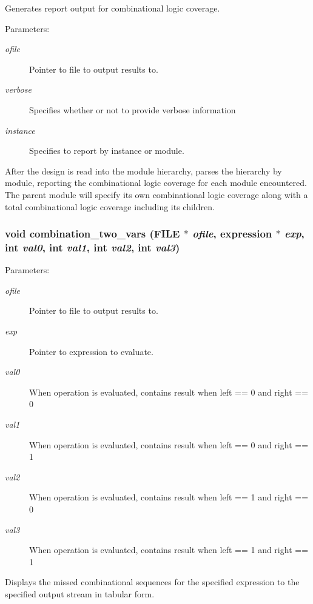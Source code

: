 Generates report output for combinational logic coverage.

\begin{Desc}
\item[Parameters: ]\par
\begin{description}
\item[{\em 
ofile}]Pointer to file to output results to. \item[{\em 
verbose}]Specifies whether or not to provide verbose information \item[{\em 
instance}]Specifies to report by instance or module.\end{description}
\end{Desc}
After the design is read into the module hierarchy, parses the hierarchy by module, reporting the combinational logic coverage for each module encountered. The parent  module will specify its own combinational logic coverage along with a total combinational logic coverage including its children. 
\subsubsection{\setlength{\rightskip}{0pt plus 5cm}void combination\_\-two\_\-vars (FILE $\ast$ {\em ofile}, {\bf expression} $\ast$ {\em exp}, int {\em val0}, int {\em val1}, int {\em val2}, int {\em val3})}\label{comb_8c_a9}


\begin{Desc}
\item[Parameters: ]\par
\begin{description}
\item[{\em 
ofile}]Pointer to file to output results to. \item[{\em 
exp}]Pointer to expression to evaluate. \item[{\em 
val0}]When operation is evaluated, contains result when left == 0 and right == 0 \item[{\em 
val1}]When operation is evaluated, contains result when left == 0 and right == 1 \item[{\em 
val2}]When operation is evaluated, contains result when left == 1 and right == 0 \item[{\em 
val3}]When operation is evaluated, contains result when left == 1 and right == 1\end{description}
\end{Desc}
Displays the missed combinational sequences for the specified expression to the specified output stream in tabular form. 
